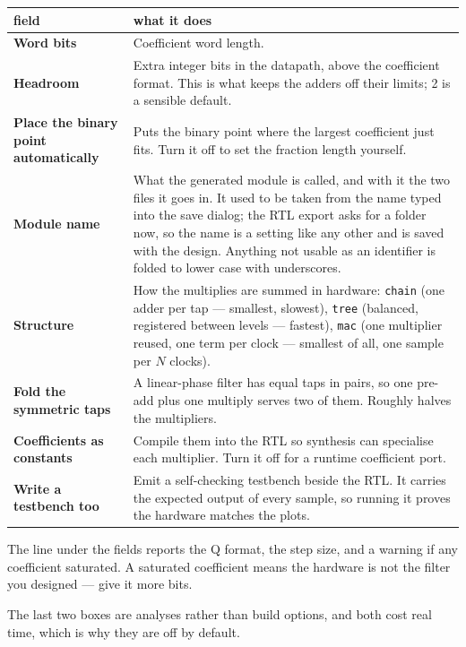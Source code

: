 \documentclass[11pt,a4paper]{article}
\newcommand{\ctl}[1]{\textbf{#1}}
\newcommand{\lit}[1]{\texttt{#1}}
\begin{document}
\begin{tabularx}{\textwidth}{@{}lY@{}}
  \toprule
  \textbf{field} & \textbf{what it does} \\
  \midrule
  \ctl{Word bits} & Coefficient word length. \\
  \addlinespace
  \ctl{Headroom} & Extra integer bits in the datapath, above the coefficient
    format. This is what keeps the adders off their limits; 2 is a sensible
    default. \\
  \addlinespace
  \ctl{Place the binary point automatically} & Puts the binary point where the
    largest coefficient just fits. Turn it off to set the fraction length
    yourself. \\
  \addlinespace
  \ctl{Module name} & What the generated module is called, and with it the two
    files it goes in. It used to be taken from the name typed into the save
    dialog; the RTL export asks for a folder now, so the name is a setting like
    any other and is saved with the design. Anything not usable as an
    identifier is folded to lower case with underscores. \\
  \addlinespace
  \ctl{Structure} & How the multiplies are summed in hardware: \lit{chain} (one
    adder per tap --- smallest, slowest), \lit{tree} (balanced, registered
    between levels --- fastest), \lit{mac} (one multiplier reused, one term per
    clock --- smallest of all, one sample per $N$ clocks). \\
  \addlinespace
  \ctl{Fold the symmetric taps} & A linear-phase filter has equal taps in
    pairs, so one pre-add plus one multiply serves two of them. Roughly halves
    the multipliers. \\
  \addlinespace
  \ctl{Coefficients as constants} & Compile them into the RTL so synthesis can
    specialise each multiplier. Turn it off for a runtime coefficient port. \\
  \addlinespace
  \ctl{Write a testbench too} & Emit a self-checking testbench beside the RTL.
    It carries the expected output of every sample, so running it proves the
    hardware matches the plots. \\
  \bottomrule
\end{tabularx}

The line under the fields reports the Q format, the step size, and a warning if
any coefficient saturated. A saturated coefficient means the hardware is not the
filter you designed --- give it more bits.

The last two boxes are analyses rather than build options, and both cost real
time, which is why they are off by default.
\end{document}
